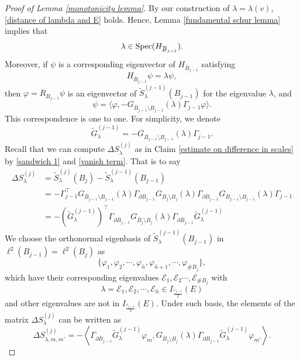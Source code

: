 \documentclass[11pt,reqno,UTF8,twoside]{amsart}
\newcommand{\spec}{{\rm Spec}}
\newcommand{\mcE}{\mathcal{E}}
\newcommand{\whn}{\widehat{n}}
\newcommand{\barB}{\overline{B}}
\newcommand{\wtSj}{\widetilde{S}^{(j)}}
\newcommand{\wtSjminusone}{\widetilde{S}^{(j-1)}}
\newcommand{\diffSj}{\Delta {S}^{(j)}}
\newcommand{\wtGjminusone}{\widetilde{G}^{(j-1)}}
\theoremstyle{definition}
\numberwithin{equation}{section}
\begin{document}
\begin{proof}[Proof of Lemma \ref{monotonicity lemma}]
By our construction of $\lambda=\lambda(v)$, \eqref{distance of lambda and E} holds. Hence, Lemma \ref{fundamental schur lemma} implies that 
\begin{equation}\label{lambda lies in HBj-1 spectrum}
  \lambda\in \spec(H_{\barB_{j-1}}).
\end{equation}
Moreover, if $\psi$ is a corresponding eigenvector of $H_{\barB_{j-1}}$ satisfying 
\[H_{\barB_{j-1}}\psi=\lambda \psi,\]
then $\varphi=R_{B_{j-1}}\psi$ is an eigenvector of $\wtSjminusone_\lambda(B_{j-1})$ for the eigenvalue $\lambda$, and
\begin{equation}\label{eigenvector correspondence}
  \psi =    \langle \varphi, -G_{\barB_{j-1}\setminus B_{j-1}}(\lambda)  \Gamma_{j-1} \varphi\rangle.
\end{equation}
This correspondence is one to one. For simplicity, we denote 
\[\widetilde{G}^{(j-1)}_{\lambda}= -G_{\barB_{j-1}\setminus B_{j-1}}(\lambda)  \Gamma_{j-1}. \]
Recall that we can compute $\diffSj_{\lambda}$ as in Claim \ref{estimate on difference in scales} by \eqref{sandwich 1} and \eqref{vanish term}. That is to say 
\begin{align*}
    \diffSj_\lambda &= \wtSj_{\lambda}(B_j)-\wtSjminusone_{\lambda}(B_{j-1}) \\
      &=   -\Gamma_{j-1}^{\top} G_{\barB_{j-1}\setminus B_{j-1}}(\lambda)  \Gamma_{\partial \barB_{j-1}}  G_{\barB_j\setminus B_j}(\lambda)  \Gamma_{\partial \barB_{j-1}} G_{\barB_{j-1}\setminus B_{j-1}}(\lambda) \Gamma_{j-1} \\
      &= - (\widetilde{G}^{(j-1)}_{\lambda})^{\top} \Gamma_{\partial \barB_{j-1}} G_{\barB_j\setminus B_j}(\lambda)  \Gamma_{\partial \barB_{j-1}} \widetilde{G}^{(j-1)}_{\lambda}
\end{align*}
We choose the orthonormal eigenbasis of $\wtSjminusone_{\lambda}(B_{j-1})$ in $\ell^2(B_{j-1})=\ell^2(B_j)$ as 
\[\{\varphi_1,\varphi_2,\cdots, \varphi_{\whn},\varphi_{\whn+1},\cdots,\varphi_{\# B_j}\},\]
which have their  corresponding eigenvalues  $\mcE_1,\mcE_2\cdots ,\mcE_{\# B_j}$  with 
\[\lambda=\mcE_1 ,\mcE_2,\cdots,\mcE_{\whn}\in I_{\frac{\varepsilon_{j-1}}{2}}(E)\]
and other eigenvalues are not in  $I_{\frac{\varepsilon_{j-1}}{2}}(E)$. Under such basis, the elements of the matrix $\diffSj_{\lambda}$ can be written   as 
\begin{equation}\label{elements under eigenbasis}
  \diffSj_{\lambda,m,m'}=-\left\langle \Gamma_{\partial \barB_{j-1}}  \wtGjminusone_{\lambda} \varphi_m,   G_{\barB_j\setminus B_j}(\lambda)  \Gamma_{\partial \barB_{j-1}} \wtGjminusone_{\lambda} \varphi_{m'} \right\rangle.

\end{equation}
\end{proof}
\end{document}
